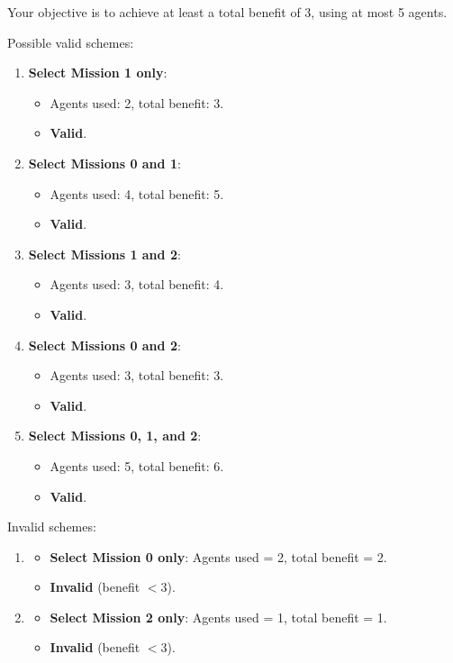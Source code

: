 \documentclass[12pt,a4paper]{article}
\begin{document}
\noindent
Your objective is to achieve at least a total benefit of \( 3 \), using at most 5 agents.

\noindent
Possible valid schemes:
\begin{enumerate}
 \item \textbf{Select Mission 1 only}:
  \begin{itemize}
   \item Agents used: 2, total benefit: 3.
   \item \textbf{Valid}.
  \end{itemize}

 \item \textbf{Select Missions 0 and 1}:
  \begin{itemize}
   \item Agents used: 4, total benefit: 5.
   \item \textbf{Valid}.
  \end{itemize}

 \item \textbf{Select Missions 1 and 2}:
  \begin{itemize}
   \item Agents used: 3, total benefit: 4.
   \item \textbf{Valid}.
  \end{itemize}

 \item \textbf{Select Missions 0 and 2}:
  \begin{itemize}
   \item Agents used: 3, total benefit: 3.
   \item \textbf{Valid}.
  \end{itemize}

 \item \textbf{Select Missions 0, 1, and 2}:
  \begin{itemize}
   \item Agents used: 5, total benefit: 6.
   \item \textbf{Valid}.
  \end{itemize}
\end{enumerate}

\noindent
Invalid schemes:
\begin{enumerate}
    \item \begin{itemize}
        \item \textbf{Select Mission 0 only}: Agents used = 2, total benefit = 2. 
        \item \textbf{Invalid} (benefit \( < 3 \)).
    \end{itemize}
    \item \begin{itemize}
        \item \textbf{Select Mission 2 only}: Agents used = 1, total benefit = 1. 
        \item \textbf{Invalid} (benefit \( < 3 \)).
    \end{itemize}
\end{enumerate}
\end{document}
